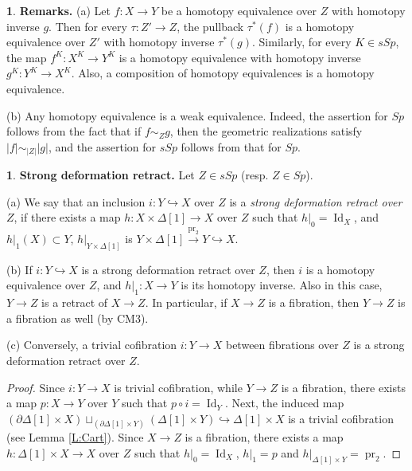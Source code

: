 \documentclass[12pt]{amsart}
\theoremstyle{plain}
\theoremstyle{definition}
\newtheorem{Emp}[Thm]{}
\numberwithin{equation}{section}
\newcommand{\lra}{\longrightarrow}
\newcommand{\hra}{\hookrightarrow}
\newcommand{\Dt}{\Delta}
\newcommand{\rl}[1]{Lemma \ref{L:#1}}
\newcommand{\pr}{\operatorname{pr}}
\newcommand{\p}{\partial}
\newcommand{\Id}{\operatorname{Id}}
\begin{document}
\begin{Emp} \label{E:herem}
{\bf Remarks.} (a) Let $f:X\to Y$ be a homotopy equivalence over
$Z$ with homotopy inverse $g$. Then for every $\tau:Z'\to Z$, the
pullback $\tau^*(f)$ is a homotopy equivalence over $Z'$ with
homotopy inverse $\tau^*(g)$. Similarly, for every $K\in sSp$, the
map $f^K:X^K\to Y^K$ is a homotopy equivalence with homotopy
inverse $g^K:Y^K\to X^K$. Also, a composition of homotopy
equivalences is a homotopy equivalence.

(b) Any homotopy equivalence is a weak equivalence. Indeed, the
assertion for $Sp$ follows from the fact that if $f\sim_Z g$, then
the geometric realizations satisfy $|f|\sim_{|Z|}|g|$, and the
assertion for $sSp$ follows from that for $Sp$.
\end{Emp}


\begin{Emp} \label{E:sdr}
{\bf Strong deformation retract.} Let $Z\in sSp$ (resp. $Z\in
Sp$).

(a) We say that an inclusion $i:Y\hra X$ over $Z$ is a {\em strong
deformation retract over $Z$}, if there exists a map $h:X\times
\Dt[1]\to X$ over $Z$ such that $h|_0=\Id_X$, and $h|_1(X)\subset Y$,
$h|_{Y\times\Dt[1]}$ is $Y\times\Dt[1]\overset{\pr_2}{\lra}Y\hra
X$.

(b) If $i:Y\hra X$ is a strong deformation retract over $Z$, then
$i$ is a homotopy equivalence over $Z$, and $h|_1:X\to Y$ is its
homotopy inverse. Also in this case, $Y\to Z$ is a retract of
$X\to Z$. In particular, if $X\to Z$ is a fibration, then $Y\to Z$
is a fibration as well (by CM3).

(c) Conversely, a trivial cofibration $i:Y\to X$ between
fibrations over $Z$ is a strong deformation retract over $Z$.

\begin{proof}
Since $i:Y\to X$ is trivial cofibration, while $Y\to Z$ is a
fibration, there exists a map $p:X\to Y$ over $Y$ such that
$p\circ i=\Id_{Y}$. Next, the induced map $(\p\Dt[1]\times
X)\sqcup_{(\p\Dt[1]\times Y)}(\Dt[1]\times Y)\hra\Dt[1]\times X$
is a trivial cofibration (see \rl{Cart}). Since $X\to Z$ is a
fibration, there exists a map $h:\Dt[1]\times X\to X$ over $Z$ such that
$h|_0=\Id_X$, $h|_1=p$ and $h|_{\Dt[1]\times Y}=\pr_2$.
\end{proof}
\end{Emp}
\end{document}
